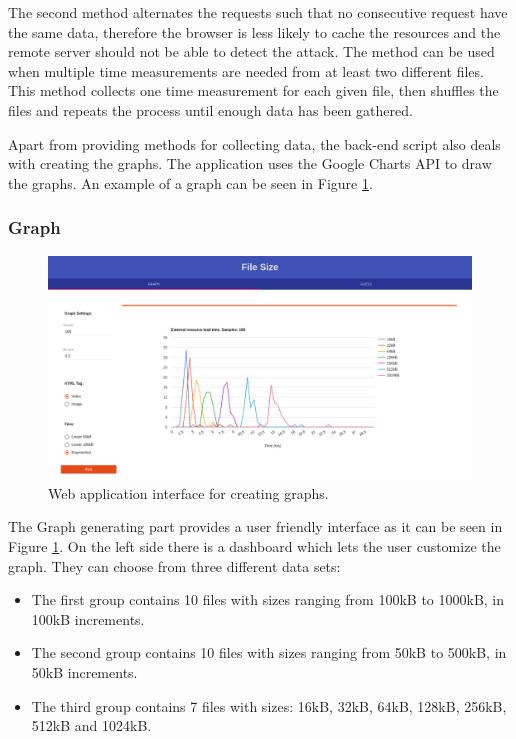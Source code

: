 \documentclass[10pt,a4paper,twoside]{book}
\begin{document}
The second method alternates the requests such that no consecutive request have the same data, therefore the browser is less likely to cache the resources and the remote server should not be able to detect the attack. The method can be used when multiple time measurements are needed from at least two different files. This method collects one time measurement for each given file, then shuffles the files and repeats the process until enough data has been gathered. 

Apart from providing methods for collecting data, the back-end script also deals with creating the graphs. The application uses the Google Charts API to draw the graphs. An example of a graph can be seen in Figure \ref{fig:videointerface}.


\subsubsection{Graph}

\begin{figure}[h]
\centering
\includegraphics[width=\textwidth]{figures/interface.png}
\caption{Web application interface for creating graphs.}
\label{fig:videointerface}
\end{figure}

The Graph generating part provides a user friendly interface as it can be seen in Figure \ref{fig:videointerface}. On the left side there is a dashboard which lets the user customize the graph. They can choose from three different data sets:
\begin{itemize}
\item The first group contains 10 files with sizes ranging from 100kB to 1000kB, in 100kB increments.
\item The second group contains 10 files with sizes ranging from 50kB to 500kB, in 50kB increments.
\item The third group contains 7 files with sizes: 16kB, 32kB, 64kB, 128kB, 256kB, 512kB and 1024kB.
\end{itemize}
\end{document}
